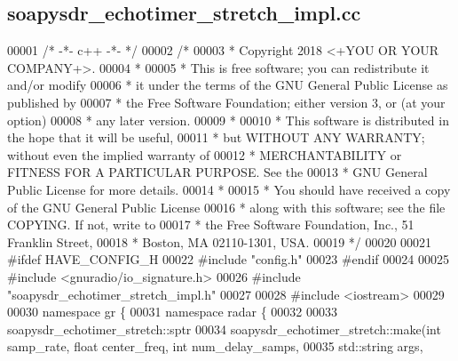 \subsection{soapysdr\+\_\+echotimer\+\_\+stretch\+\_\+impl.\+cc}
\label{soapysdr__echotimer__stretch__impl_8cc_source}

\begin{DoxyCode}
00001 \textcolor{comment}{/* -*- c++ -*- */}
00002 \textcolor{comment}{/*}
00003 \textcolor{comment}{ * Copyright 2018 <+YOU OR YOUR COMPANY+>.}
00004 \textcolor{comment}{ *}
00005 \textcolor{comment}{ * This is free software; you can redistribute it and/or modify}
00006 \textcolor{comment}{ * it under the terms of the GNU General Public License as published by}
00007 \textcolor{comment}{ * the Free Software Foundation; either version 3, or (at your option)}
00008 \textcolor{comment}{ * any later version.}
00009 \textcolor{comment}{ *}
00010 \textcolor{comment}{ * This software is distributed in the hope that it will be useful,}
00011 \textcolor{comment}{ * but WITHOUT ANY WARRANTY; without even the implied warranty of}
00012 \textcolor{comment}{ * MERCHANTABILITY or FITNESS FOR A PARTICULAR PURPOSE.  See the}
00013 \textcolor{comment}{ * GNU General Public License for more details.}
00014 \textcolor{comment}{ *}
00015 \textcolor{comment}{ * You should have received a copy of the GNU General Public License}
00016 \textcolor{comment}{ * along with this software; see the file COPYING.  If not, write to}
00017 \textcolor{comment}{ * the Free Software Foundation, Inc., 51 Franklin Street,}
00018 \textcolor{comment}{ * Boston, MA 02110-1301, USA.}
00019 \textcolor{comment}{ */}
00020 
00021 \textcolor{preprocessor}{#ifdef HAVE\_CONFIG\_H}
00022 \textcolor{preprocessor}{#include "config.h"}
00023 \textcolor{preprocessor}{#endif}
00024 
00025 \textcolor{preprocessor}{#include <gnuradio/io\_signature.h>}
00026 \textcolor{preprocessor}{#include "soapysdr_echotimer_stretch_impl.h"}
00027 
00028 \textcolor{preprocessor}{#include <iostream>}
00029 
00030 \textcolor{keyword}{namespace }gr \{
00031   \textcolor{keyword}{namespace }radar \{
00032 
00033     soapysdr_echotimer_stretch::sptr
00034     soapysdr_echotimer_stretch::make(\textcolor{keywordtype}{int} samp_rate, \textcolor{keywordtype}{float} center_freq, \textcolor{keywordtype}{int} num\_delay\_samps,
00035                               std::string args,

\end{DoxyCode}
